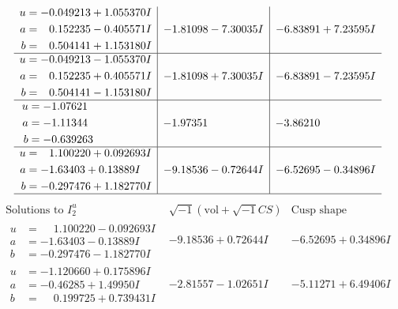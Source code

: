 \documentclass[1p]{elsarticle_modified}
\theoremstyle{definition}
\newcommand{\I}{\sqrt{-1}}
\begin{document}
$$\begin{array}{c|c|c}
\begin{aligned}
u &= -0.049213 + 1.055370 I \\
a &= \phantom{-}0.152235 - 0.405571 I \\
b &= \phantom{-}0.504141 + 1.153180 I\end{aligned}
 & -1.81098 - 7.30035 I & -6.83891 + 7.23595 I \\ \hline\begin{aligned}
u &= -0.049213 - 1.055370 I \\
a &= \phantom{-}0.152235 + 0.405571 I \\
b &= \phantom{-}0.504141 - 1.153180 I\end{aligned}
 & -1.81098 + 7.30035 I & -6.83891 - 7.23595 I \\ \hline\begin{aligned}
u &= -1.07621\phantom{ +0.000000I} \\
a &= -1.11344\phantom{ +0.000000I} \\
b &= -0.639263\phantom{ +0.000000I}\end{aligned}
 & -1.97351\phantom{ +0.000000I} & -3.86210\phantom{ +0.000000I} \\ \hline\begin{aligned}
u &= \phantom{-}1.100220 + 0.092693 I \\
a &= -1.63403 + 0.13889 I \\
b &= -0.297476 + 1.182770 I\end{aligned}
 & -9.18536 - 0.72644 I & -6.52695 - 0.34896 I\\
 \hline 
 \end{array}$$\newpage$$\begin{array}{c|c|c}  
\text{Solutions to }I^u_{2}& \I (\text{vol} + \sqrt{-1}CS) & \text{Cusp shape}\\
 \hline 
\begin{aligned}
u &= \phantom{-}1.100220 - 0.092693 I \\
a &= -1.63403 - 0.13889 I \\
b &= -0.297476 - 1.182770 I\end{aligned}
 & -9.18536 + 0.72644 I & -6.52695 + 0.34896 I \\ \hline\begin{aligned}
u &= -1.120660 + 0.175896 I \\
a &= -0.46285 + 1.49950 I \\
b &= \phantom{-}0.199725 + 0.739431 I\end{aligned}
 & -2.81557 - 1.02651 I & -5.11271 + 6.49406 I \\ \hline\begin{aligned}

\end{aligned}
\end{array}$$
\end{document}
